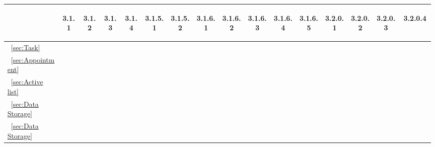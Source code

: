 \documentclass[12pt]{article}
\renewcommand{\c}{\checkmark}
\begin{document}
\begin{center}
\begin{tabular}{|l||*{15}{c|}}
\hline
	&\begin{sideways}3.1.1\end{sideways} & \begin{sideways}3.1.2\end{sideways} & \begin{sideways}3.1.3\end{sideways} & \begin{sideways}3.1.4\end{sideways} &
	\begin{sideways}3.1.5.1\end{sideways} & \begin{sideways}3.1.5.2\end{sideways} & \begin{sideways}3.1.6.1\end{sideways} & \begin{sideways}3.1.6.2\end{sideways} & \begin{sideways}3.1.6.3\end{sideways} & \begin{sideways}3.1.6.4\end{sideways} & \begin{sideways}3.1.6.5\end{sideways} &
	\begin{sideways}3.2.0.1\end{sideways} & \begin{sideways}3.2.0.2\end{sideways} & \begin{sideways}3.2.0.3\end{sideways} & \begin{sideways}3.2.0.4~~\end{sideways}\\
\hline
\hline
~\ref{sec:Task}	&\c	&	&	&	&	&	&	&	&	&	&	&	&	&	&	\\
\hline
~\ref{sec:Appointment}	&	&\c	&	&	&	&	&	&	&	&	&	&	&	&	&	\\
\hline
~\ref{sec:Active list}	&	&	&	&	&	&	&	&	&	&	&	&	&	&	&	\\
\hline
~\ref{sec:Data Storage}	&	&	&	&	&	&	&	&	&	&	&	&	&	&	&	\\
\hline
~\ref{sec:Data Storage}	&	&	&	&	&	&	&	&	&	&	&	&	&	&	&	\\
\hline
\end{tabular}
\end{center}
\end{document}
